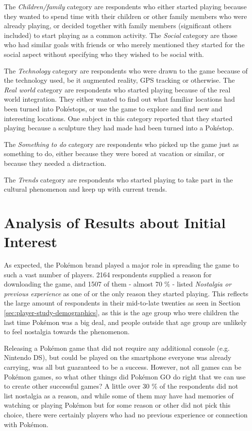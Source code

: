 The \emph{Children/family} category are respondents who either started playing because they wanted to spend time with their children or other family members who were already playing, or decided together with family members (significant others included) to start playing as a common activity. The \emph{Social} category are those who had similar goals with friends or who merely mentioned they started for the social aspect without specifying who they wished to be social with.

The \emph{Technology} category are respondents who were drawn to the game because of the technology used, be it augmented reality, GPS tracking or otherwise. The \emph{Real world} category are respondents who started playing because of the real world integration. They either wanted to find out what familiar locations had been turned into Pokéstops, or use the game to explore and find new and interesting locations. One subject in this category reported that they started playing because a sculpture they had made had been turned into a Pokéstop.

The \emph{Something to do} category are respondents who picked up the game just as something to do, either because they were bored at vacation or similar, or because they needed a distraction.

The \emph{Trends} category are respondents who started playing to take part in the cultural phenomenon and keep up with current trends.


\section{Analysis of Results about Initial Interest}
\label{sec:success-factors-initial-interest-analysis}

As expected, the Pokémon brand played a major role in spreading the game to such a vast number of players. 2164 respondents supplied a reason for downloading the game, and 1507 of them - almost 70 \% - listed \emph{Nostalgia or previous experience} as one of or the only reason they started playing. This reflects the large amount of respondents in their mid-to-late twenties as seen in Section \ref{sec:player-study-demographics}, as this is the age group who were children the last time Pokémon was a big deal, and people outside that age group are unlikely to feel nostalgia towards the phenomenon.

Releasing a Pokémon game that did not require any additional console (e.g. Nintendo DS), but could be played on the smartphone everyone was already carrying, was all but guaranteed to be a success. However, not all games can be Pokémon games, so what other things did Pokémon GO do right that we can use to create other successful games? A little over 30 \% of the respondents did not list nostalgia as a reason, and while some of them may have had memories of watching or playing Pokémon but for some reason or other did not pick this choice, there were certainly players who had no previous experience or connection with Pokémon.

